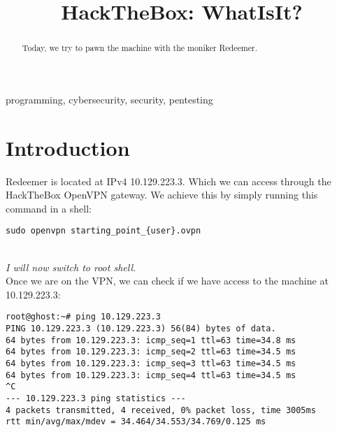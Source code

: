 \documentclass[conference]{IEEEtran}
\begin{document}
\title{HackTheBox: WhatIsIt?}

\author{
}

\maketitle



\begin{abstract}
Today, we try to pawn the machine with the moniker Redeemer.
\end{abstract}



\begin{IEEEkeywords}
programming, cybersecurity, security, pentesting
\end{IEEEkeywords}


\section{Introduction}
Redeemer is located at IPv4 10.129.223.3. Which we can access through the HackTheBox OpenVPN gateway.
We achieve this by simply running this command in a shell:
\begin{scriptsize}
\begin{verbatim}
sudo openvpn starting_point_{user}.ovpn
\end{verbatim}
\end{scriptsize}

\\
\textit{I will now switch to root shell.}
\\

Once we are on the VPN, we can check if we have access to the machine at 10.129.223.3:
\begin{scriptsize}
\begin{verbatim}
root@ghost:~# ping 10.129.223.3
PING 10.129.223.3 (10.129.223.3) 56(84) bytes of data.
64 bytes from 10.129.223.3: icmp_seq=1 ttl=63 time=34.8 ms
64 bytes from 10.129.223.3: icmp_seq=2 ttl=63 time=34.5 ms
64 bytes from 10.129.223.3: icmp_seq=3 ttl=63 time=34.5 ms
64 bytes from 10.129.223.3: icmp_seq=4 ttl=63 time=34.5 ms
^C
--- 10.129.223.3 ping statistics ---
4 packets transmitted, 4 received, 0% packet loss, time 3005ms
rtt min/avg/max/mdev = 34.464/34.553/34.769/0.125 ms

\end{verbatim}
\end{scriptsize}
\end{document}
